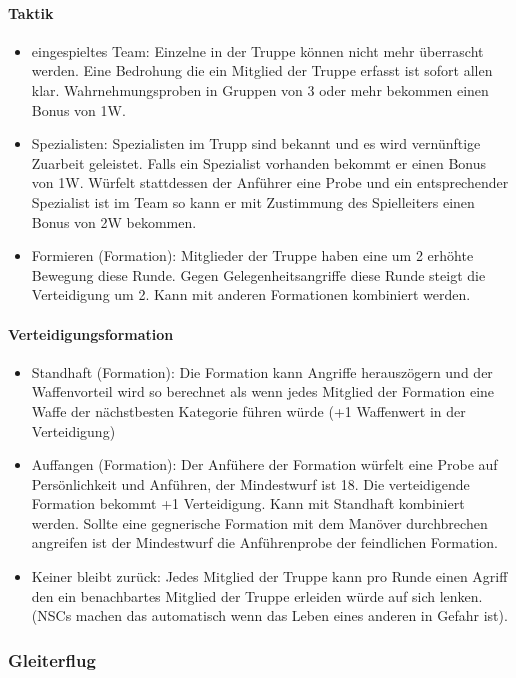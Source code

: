 \documentclass{article}
\begin{document}
\paragraph{Taktik}

\begin{itemize}
\item eingespieltes Team: Einzelne in der Truppe können nicht mehr überrascht werden. Eine Bedrohung die ein Mitglied der Truppe erfasst ist sofort allen klar. Wahrnehmungsproben in Gruppen von 3 oder mehr bekommen einen Bonus von 1W.
\item Spezialisten: Spezialisten im Trupp sind bekannt und es wird vernünftige Zuarbeit geleistet. Falls ein Spezialist vorhanden bekommt er einen Bonus von 1W. Würfelt stattdessen der Anführer eine Probe und ein entsprechender Spezialist ist im Team so kann er mit Zustimmung des Spielleiters einen Bonus von 2W bekommen.
\item Formieren (Formation): Mitglieder der Truppe haben eine um 2 erhöhte Bewegung diese Runde. Gegen Gelegenheitsangriffe diese Runde steigt die Verteidigung um 2. Kann mit anderen Formationen kombiniert werden.
\end{itemize}

\paragraph{Verteidigungsformation}

\begin{itemize}
\item Standhaft (Formation): Die Formation kann Angriffe herauszögern und der Waffenvorteil wird so berechnet als wenn jedes Mitglied der Formation eine Waffe der nächstbesten Kategorie führen würde (+1 Waffenwert in der Verteidigung)
\item Auffangen (Formation): Der Anfühere der Formation würfelt eine Probe auf Persönlichkeit und Anführen, der Mindestwurf ist 18. Die verteidigende Formation bekommt +1 Verteidigung. Kann mit Standhaft kombiniert werden. Sollte eine gegnerische Formation mit dem Manöver durchbrechen angreifen ist der Mindestwurf die Anführenprobe der feindlichen Formation.
\item Keiner bleibt zurück: Jedes Mitglied der Truppe kann pro Runde einen Agriff den ein benachbartes Mitglied der Truppe erleiden würde auf sich lenken. (NSCs machen das automatisch wenn das Leben eines anderen in Gefahr ist).
\end{itemize}

\subsubsection{Gleiterflug}
\end{document}
